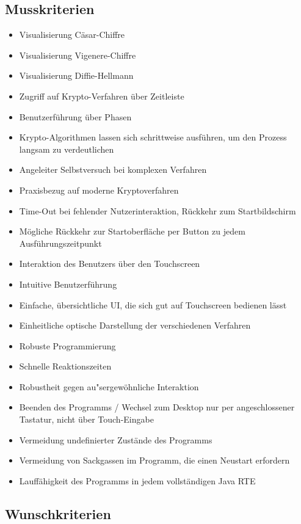 \documentclass{article}
\begin{document}
\subsection{Musskriterien}

\begin{itemize}
    \item Visualisierung Cäsar-Chiffre
    \item Visualisierung Vigenere-Chiffre
    \item Visualisierung Diffie-Hellmann
    \item Zugriff auf Krypto-Verfahren über Zeitleiste
    \item Benutzerführung über Phasen
    \item Krypto-Algorithmen lassen sich schrittweise ausführen, um den Prozess
        langsam zu verdeutlichen
    \item Angeleiter Selbstversuch bei komplexen Verfahren
    \item Praxisbezug auf moderne Kryptoverfahren
    \item Time-Out bei fehlender Nutzerinteraktion, Rückkehr zum Startbildschirm
    \item Mögliche Rückkehr zur Startoberfläche per Button zu jedem Ausführungszeitpunkt
    \item Interaktion des Benutzers über den Touchscreen
    \item Intuitive Benutzerführung
    \item Einfache, übersichtliche \gls{UI}, die sich gut auf Touchscreen bedienen lässt
    \item Einheitliche optische Darstellung der verschiedenen Verfahren
    \item Robuste Programmierung
    \item Schnelle Reaktionszeiten
    \item Robustheit gegen au"sergewöhnliche Interaktion
    \item Beenden des Programms / Wechsel zum Desktop nur per angeschlossener Tastatur, nicht über Touch-Eingabe
    \item Vermeidung undefinierter Zustände des Programms
    \item Vermeidung von Sackgassen im Programm, die einen Neustart erfordern
    \item Lauffähigkeit des Programms in jedem vollständigen Java RTE
\end{itemize}

\subsection{Wunschkriterien}
\end{document}
